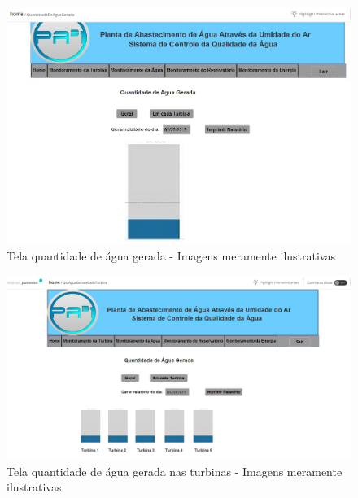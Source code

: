\begin{center}
\begin{figure}[!ht]
\centering
\includegraphics[scale=0.5]{figuras/13}
\caption[Tela quantidade de água gerada]{Tela quantidade de água gerada - Imagens meramente ilustrativas}
\label{tela_quantidade_de_agua_geral}
\end{figure}
\clearpage

\begin{figure}[!ht]
\centering
\includegraphics[scale=0.5]{figuras/quantidade_de_agua_gerada_turbina}
\caption[Tela quantidade de água gerada nas turbinas]{Tela quantidade de água gerada nas turbinas - Imagens meramente ilustrativas}
\label{tela_quantidade_de_agua_turbinas}
\end{figure}
\clearpage


\end{center}
